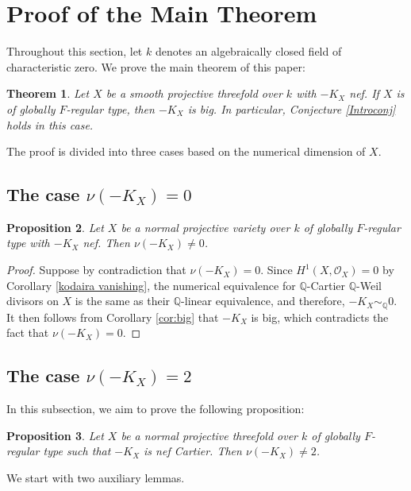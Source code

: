 \documentclass[12pt]{amsart}
\newcommand{\Q}{\mathbb{Q}}
\newcommand{\sO}{\mathcal{O}}
\theoremstyle{plain}
\newtheorem{thm}{Theorem}[section]
\newtheorem{prop}[thm]{Proposition}
\theoremstyle{definition}
\theoremstyle{remark}
\newtheorem{defn and notation}[thm]{Definition and Notation}
\theoremstyle{plain}
\begin{document}
\section{Proof of the Main Theorem}
Throughout this section, let $k$ denotes an algebraically closed field of characteristic zero. 
We  prove the main theorem of this paper: 

\begin{thm}\label{mainthm}
Let $X$ be a smooth projective threefold over $k$ with $-K_X$ nef. 
If $X$ is of globally $F$-regular type, then $-K_X$ is big. 
In particular, Conjecture \ref{Introconj} holds in this case.
\end{thm}

The proof is divided into three cases based on the numerical dimension of $X$. 

\subsection{The case $\nu(-K_X)=0$}

\begin{prop}\label{prop:nu=0}
    Let $X$ be a normal projective variety over $k$ of globally $F$-regular type with $-K_X$ nef.
    Then $\nu(-K_X)\neq 0$.
\end{prop}
\begin{proof}
    Suppose by contradiction that $\nu(-K_X)= 0$.
    Since $H^1(X, \sO_X)=0$ by Corollary \ref{kodaira vanishing}, the numerical equivalence for $\Q$-Cartier $\Q$-Weil divisors on $X$ is the same as their $\Q$-linear equivalence, and therefore, $-K_X\sim_{\Q}0$.
    It then follows from Corollary \ref{cor:big} that $-K_X$ is big, which contradicts the fact that $\nu(-K_X)= 0$.
\end{proof}

\subsection{The case $\nu(-K_X)=2$}

In this subsection, we aim to prove the following proposition:

\begin{prop}\label{prop:nu=2}
    Let $X$ be a normal projective threefold over $k$ of globally $F$-regular type such that $-K_X$ is nef Cartier.
    Then $\nu(-K_X)\neq 2$.
\end{prop}

We start with two auxiliary lemmas.
\end{document}
